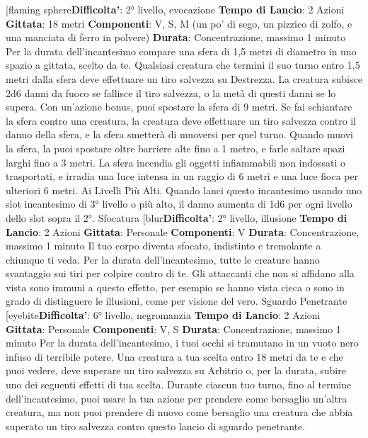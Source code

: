 \begin{multicols}{2}
[flaming sphere\textbf{Difficolta'}:
2° livello, evocazione
\textbf{Tempo di Lancio}: 2 Azioni
\textbf{Gittata}: 18 metri
\textbf{Componenti}: V, S, M (un po’ di sego, un pizzico di
zolfo, e una manciata di ferro in polvere)
\textbf{Durata}: Concentrazione, massimo 1 minuto
Per la durata dell’incantesimo compare una sfera di 1,5
metri di diametro in uno spazio a gittata, scelto da te.
Qualsiasi creatura che termini il suo turno entro 1,5
metri dalla sfera deve effettuare un tiro salvezza su
Destrezza. La creatura subisce 2d6 danni da fuoco se
fallisce il tiro salvezza, o la metà di questi danni se lo
supera.
Con un’azione bonus, puoi spostare la sfera di 9 metri.
Se fai schiantare la sfera contro una creatura, la
creatura deve effettuare un tiro salvezza contro il danno
della sfera, e la sfera smetterà di muoversi per quel
turno.
Quando muovi la sfera, la puoi spostare oltre barriere
alte fino a 1 metro, e farle saltare spazi larghi fino a 3
metri. La sfera incendia gli oggetti infiammabili non
indossati o trasportati, e irradia una luce intensa in un
raggio di 6 metri e una luce fioca per ulteriori 6 metri.
Ai Livelli Più Alti. Quando lanci questo incantesimo
usando uno slot incantesimo di 3° livello o più alto, il
danno aumenta di 1d6 per ogni livello dello slot sopra il
2°.
Sfocatura
[blur\textbf{Difficolta'}:
2° livello, illusione
\textbf{Tempo di Lancio}: 2 Azioni
\textbf{Gittata}: Personale
\textbf{Componenti}: V
\textbf{Durata}: Concentrazione, massimo 1 minuto
Il tuo corpo diventa sfocato, indistinto e tremolante a
chiunque ti veda. Per la durata dell’incantesimo, tutte le
creature hanno svantaggio sui tiri per colpire contro di
te. Gli attaccanti che non si affidano alla vista sono
immuni a questo effetto, per esempio se hanno vista
cieca o sono in grado di distinguere le illusioni, come
per visione del vero.
Sguardo Penetrante
[eyebite\textbf{Difficolta'}:
6° livello, negromanzia
\textbf{Tempo di Lancio}: 2 Azioni
\textbf{Gittata}: Personale
\textbf{Componenti}: V, S
\textbf{Durata}: Concentrazione, massimo 1 minuto
Per la durata dell’incantesimo, i tuoi occhi si tramutano
in un vuoto nero infuso di terribile potere. Una creatura
a tua scelta entro 18 metri da te e che puoi vedere,
deve superare un tiro salvezza su Arbitrio o, per la
durata, subire uno dei seguenti effetti di tua scelta.
Durante ciascun tuo turno, fino al termine
dell’incantesimo, puoi usare la tua azione per prendere
come bersaglio un’altra creatura, ma non puoi prendere
di nuovo come bersaglio una creatura che abbia
superato un tiro salvezza contro questo lancio di
sguardo penetrante.

\end{multicols}

